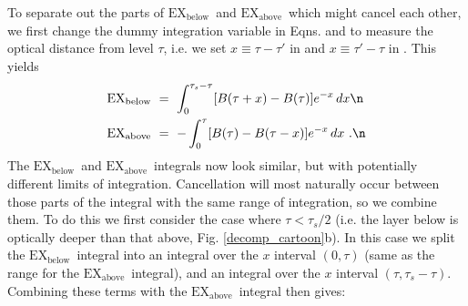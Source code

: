 \documentclass[10pt]{article}
\newcommand{\taus}{\ensuremath{\tau_s}}
\newcommand{\EXbelow}{\ensuremath{\mathrm{EX_{below}}}}
\newcommand{\EXabove}{\ensuremath{\mathrm{EX_{above}}}}
\begin{document}
To separate out the parts of \EXbelow\ and \EXabove\ which might cancel each other, we first change the dummy integration variable in  Eqns.   and  to measure the optical distance from level $\tau$, i.e. we set
$x \equiv \tau-\tau'$ in  and $x \equiv \tau'-\tau$ in . This yields
\begin{align}	
\EXbelow &\  = \ \int_{0}^{\taus - \tau} [B(\tau+x)-B(\tau)]e^{-x} \, dx \n \\	
\EXabove &\ = \ -\int_{0}^{ \tau} [B(\tau)-B(\tau-x)]e^{-x} \, dx 	\ . \n
\end{align}	
The \EXbelow\ and \EXabove\ integrals now look similar, but with potentially different limits of integration. Cancellation will most naturally occur between those parts of the integral with the same range of integration, so we combine them. To do this we first consider the case where $\tau < \taus/2$ (i.e.  the layer below is optically deeper than that above, Fig. \ref{decomp_cartoon}b). In this case we split the \EXbelow\ integral into an integral over the $x$ interval $(0,\tau)$ (same as the range for the \EXabove\ integral), and an integral over the $x$ interval $(\tau,\taus-\tau)$. Combining these terms with  the \EXabove\ integral  then gives:
\end{document}

